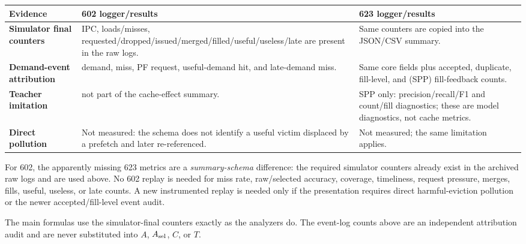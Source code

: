 \documentclass[10pt]{article}
\begin{document}
\begin{tabularx}{\textwidth}{@{}>{\bfseries}lXX@{}}
\toprule
Evidence & 602 logger/results & 623 logger/results \\
\midrule
Simulator final counters & IPC, loads/misses, requested/dropped/issued/merged/filled/useful/useless/late are present in the raw logs. & Same counters are copied into the JSON/CSV summary.\\
Demand-event attribution & demand, miss, PF request, useful-demand hit, and late-demand miss. & Same core fields plus accepted, duplicate, fill-level, and (SPP) fill-feedback counts.\\
Teacher imitation & not part of the cache-effect summary. & SPP only: precision/recall/F1 and count/fill diagnostics; these are model diagnostics, not cache metrics.\\
Direct pollution & Not measured: the schema does not identify a useful victim displaced by a prefetch and later re-referenced. & Not measured; the same limitation applies.\\
\bottomrule
\end{tabularx}

\begin{infobox}[title={\bfseries Replay decision}]
For 602, the apparently missing 623 metrics are a \emph{summary-schema}
difference: the required simulator counters already exist in the archived raw
logs and are used above.  No 602 replay is needed for miss rate, raw/selected
accuracy, coverage, timeliness, request pressure, merges, fills, useful,
useless, or late counts.  A new instrumented replay is needed only if the
presentation requires direct harmful-eviction pollution or the newer
accepted/fill-level event audit.
\end{infobox}

{\footnotesize The main formulas use the simulator-final counters exactly as
the analyzers do.  The event-log counts above are an independent attribution
audit and are never substituted into $A$, $A_{\rm sel}$, $C$, or $T$.}
\end{document}
